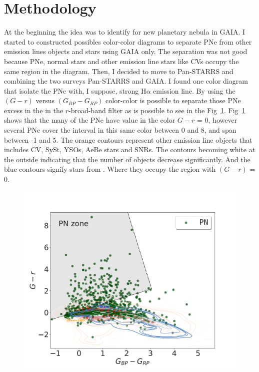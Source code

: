 \documentclass[twocolumn]{article}
\newcommand\ha{\ensuremath{\mathrm{H\alpha}}}
\begin{document}
\section{Methodology}
\label{sec:metho}

At the beginning the idea was to identify for new planetary nebula in GAIA.
I started to constructed possibles color-color diagrams to separate PNe from
other emission lines objects and stars using GAIA only. The separation was not
good because PNe, normal stars and other emission line stars like CVs occupy the same region
in the diagram. Then, I decided to move to Pan-STARRS and combining the two
surveys Pan-STARRS and GAIA. I found one color diagram that isolate the PNe
with, I suppose, strong \ha{} emission line. By using the \((G - r)\) versus \((G_{BP} - G_{RP})\)
color-color is possible to separate those PNe excess in the in the $r$-broad-band
filter as is possible to see in the Fig~\ref{fig:gaia-ps}. Fig~\ref{fig:gaia-ps}
shows that the many of the PNe have value in the color \(G - r\) = 0, however several
PNe cover the interval in this same color between 0 and 8, and span between -1 and 5.
The orange contours represent other emission line objects that includes CV, SySt,
YSOs, AeBe stars and SNRs. The contours becoming white at the outside indicating
that the number of objects decrease significantly. And the blue contours signify
stars from \citet{Smart:2021}. Where they occupy the region with \((G - r)\) = 0.

\begin{figure}
\centering
  \includegraphics[width=0.9\linewidth]{../Figs/color-diagram-ps-gaiaEDR3.pdf}
  \caption{} 
  \label{fig:gaia-ps}
\end{figure}
\end{document}
